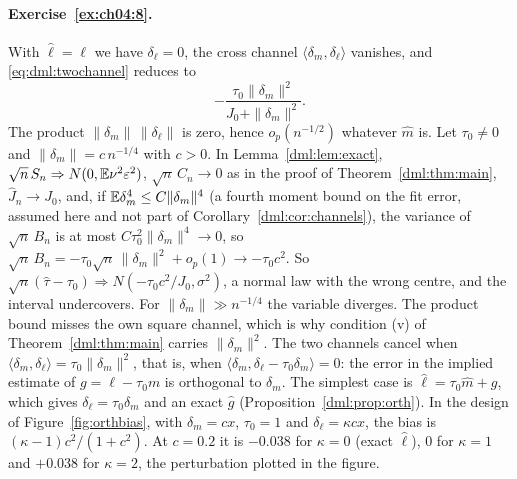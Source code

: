 \paragraph{Exercise~\ref{ex:ch04:8}.} With $\hat\ell = \ell$ we have $\delta_\ell = 0$, the cross channel $\langle\delta_m, \delta_\ell\rangle$ vanishes, and \eqref{eq:dml:twochannel} reduces to
\[
-\frac{\tau_0\|\delta_m\|^2}{J_0 + \|\delta_m\|^2}.
\]
The product $\|\delta_m\|\,\|\delta_\ell\|$ is zero, hence $o_p(n^{-1/2})$ whatever $\hat m$ is. Let $\tau_0 \neq 0$ and $\|\delta_m\| = c\,n^{-1/4}$ with $c > 0$. In Lemma~\ref{dml:lem:exact}, $\sqrt n\,S_n \Rightarrow N(0, \mathbb{E}\nu^2\varepsilon^2)$, $\sqrt n\,C_n \to 0$ as in the proof of Theorem~\ref{dml:thm:main}, $\hat J_n \to J_0$, and, if $\mathbb{E}\delta_m^4 \le C\|\delta_m\|^4$ (a fourth moment bound on the fit error, assumed here and not part of Corollary~\ref{dml:cor:channels}), the variance of $\sqrt n\,B_n$ is at most $C\tau_0^2\|\delta_m\|^4 \to 0$, so $\sqrt n\,B_n = -\tau_0\sqrt n\,\|\delta_m\|^2 + o_p(1) \to -\tau_0c^2$. So $\sqrt n(\hat\tau - \tau_0) \Rightarrow N(-\tau_0c^2/J_0, \sigma^2)$, a normal law with the wrong centre, and the interval undercovers. For $\|\delta_m\| \gg n^{-1/4}$ the variable diverges. The product bound misses the own square channel, which is why condition (v) of Theorem~\ref{dml:thm:main} carries $\|\delta_m\|^2$. The two channels cancel when $\langle\delta_m, \delta_\ell\rangle = \tau_0\|\delta_m\|^2$, that is, when $\langle\delta_m, \delta_\ell - \tau_0\delta_m\rangle = 0$: the error in the implied estimate of $g = \ell - \tau_0 m$ is orthogonal to $\delta_m$. The simplest case is $\hat\ell = \tau_0\hat m + g$, which gives $\delta_\ell = \tau_0\delta_m$ and an exact $\hat g$ (Proposition~\ref{dml:prop:orth}). In the design of Figure~\ref{fig:orthbias}, with $\delta_m = cx$, $\tau_0 = 1$ and $\delta_\ell = \kappa c x$, the bias is $(\kappa - 1)c^2/(1 + c^2)$. At $c = 0.2$ it is $-0.038$ for $\kappa = 0$ (exact $\hat\ell$), 0 for $\kappa = 1$ and $+0.038$ for $\kappa = 2$, the perturbation plotted in the figure.

